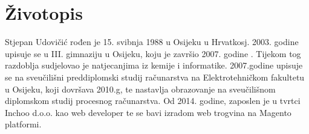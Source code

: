 \section*{Životopis}

Stjepan Udovičić rođen je 15. svibnja 1988 u Osijeku u Hrvatkosj. 2003. godine upisuje se u III. gimnaziju u Osijeku, koju je završio 2007. godine . Tijekom tog razdoblja sudjelovao je natjecanjima iz kemije i informatike. 2007.godine upisuje se na sveučilišni preddiplomski studij računarstva na Elektrotehničkom fakultetu u Osijeku, koji dovršava 2010.g, te nastavlja obrazovanje na sveučilišnom diplomskom studij procesnog računarstva. Od 2014. godine, zaposlen je u tvrtci Inchoo d.o.o. kao web developer te se bavi izradom web trogvina na Magento platformi.